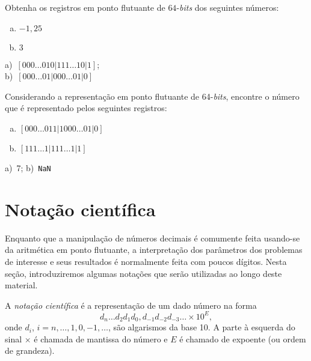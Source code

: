 \begin{exer}
  Obtenha os registros em ponto flutuante de $64$-{\it bits} dos seguintes números:
  \begin{enumerate}[a)]
  \item $-1,25$
  \item $3$
  \end{enumerate}
\end{exer}
\begin{resp}
    a)~$[000\ldots 0 10|111\ldots 10|1]$;\\
    b)~$[000\ldots 01|000\ldots 01|0]$
\end{resp}

\begin{exer}
  Considerando a representação em ponto flutuante de 64-{\it bits}, encontre o número que é representado pelos seguintes registros:
  \begin{enumerate}[a)]
  \item $[000\ldots 011|1000\ldots 01|0]$
  \item $[111\ldots 1|111\ldots 1|1]$
  \end{enumerate}
\end{exer}
\begin{resp}
    a)~7; b)~\verb+NaN+
\end{resp}

\section{Notação científica}\label{cap_aritm_sec_notcient}

Enquanto que a manipulação de números decimais é comumente feita usando-se da aritmética em ponto flutuante, a interpretação dos parâmetros dos problemas de interesse e seus resultados é normalmente feita com poucos dígitos. Nesta seção, introduziremos algumas notações que serão utilizadas ao longo deste material.

A \emph{notação científica} é a representação de um dado número na forma
\begin{equation}
  d_{n}\ldots d_2d_1d_0,d_{-1}d_{-2}d_{-3}\ldots \times 10^{E},
\end{equation}
onde $d_i$, $i=n, \ldots, 1, 0, -1, \ldots$, são algarismos da base 10. A parte à esquerda do sinal $\times$ é chamada de mantissa do número e $E$ é chamado de expoente (ou ordem de grandeza).

